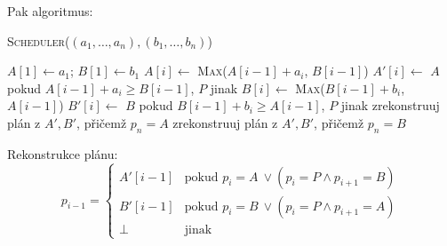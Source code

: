 \documentclass[12pt]{article}
\newcommand{\la}{\leftarrow}
\begin{document}
\noindent
Pak algoritmus:
\begin{algorithm}
\textsc{Scheduler}($(a_1,\dots,a_n),(b_1,\dots,b_n)$)
\begin{algorithmic}[1]
\STATE $A[1] \la a_1$; $B[1] \la b_1$
\FOR {$i \la 2~to~n$}
\STATE $A[i] \la$ \textsc{Max}($A[i-1]+a_i$, $B[i-1]$)
\STATE $A'[i] \la$ $A$ pokud $A[i-1]+a_i \geq B[i-1]$, $P$ jinak
\STATE $B[i] \la$ \textsc{Max}($B[i-1]+b_i$, $A[i-1]$)
\STATE $B'[i] \la$ $B$ pokud $B[i-1]+b_i \geq A[i-1]$, $P$ jinak
\ENDFOR
{}
\RETURN zrekonstruuj plán z $A',B'$, přičemž $p_n = A$
\ELSE
\RETURN zrekonstruuj plán z $A',B'$, přičemž $p_n = B$
\ENDIF
\end{algorithmic}
\end{algorithm}

\noindent
Rekonstrukce plánu:
\begin{equation*}
p_{i-1} = \left\{
	\begin{array}{cl}
	A'[i-1] & \text{pokud $p_{i} = A~\vee (p_i=P \wedge p_{i+1}=B)$}\\
	B'[i-1] & \text{pokud $p_{i} = B~\vee (p_i=P \wedge p_{i+1}=A)$}\\
	\bot & \text{jinak}
	\end{array} \right.
\end{equation*}

\end{document}
